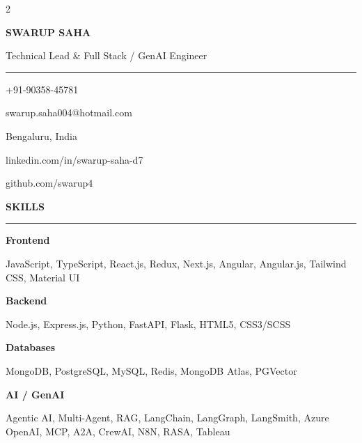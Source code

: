 \documentclass[10pt,a4paper]{article}
\newcommand{\sideheading}[1]{%
  \vspace{6pt}
  {\fontsize{9.3}{11}\bfseries\color{white}#1}\par
  \vspace{2pt}
  \textcolor{sidebarline}{\rule{\linewidth}{0.45pt}}
  \vspace{3pt}
}
\newcommand{\sideitem}[2]{%
  {\fontsize{8}{9.5}\bfseries\color{white}#1}\par
  {\fontsize{7.8}{9.5}\color{white}#2}\par
  \vspace{3pt}
}
\newcommand{\contact}[2]{%
  {\color{white}\fontsize{8}{9.5}\selectfont #1}\quad
  {\color{white}\fontsize{7.6}{9.5}\selectfont #2}\par
  \vspace{4pt}
}
\begin{document}
\setlength{\columnsep}{0.25in}

\begin{paracol}{2}

\colorbox{sidebar}{%
\begin{minipage}[t][10.95in][t]{\dimexpr\linewidth-2\fboxsep\relax}
\raggedright

\vspace{12pt}

\begin{center}
\end{center}

\vspace{8pt}

\begin{center}
  {\fontsize{16}{18}\bfseries\color{white}SWARUP SAHA}\par
  \vspace{3pt}
  {\fontsize{8.6}{10.5}\color{white}
  Technical Lead \& Full Stack / GenAI Engineer}
\end{center}

\vspace{8pt}
\textcolor{sidebarline}{\rule{\linewidth}{0.55pt}}
\vspace{7pt}

\contact{\faPhone}{+91-90358-45781}
\contact{\faEnvelope}{swarup.saha004@hotmail.com}
\contact{\faMapMarker*}{Bengaluru, India}
\contact{\faLinkedin}{linkedin.com/in/swarup-saha-d7}
\contact{\faGithub}{github.com/swarup4}

\sideheading{SKILLS}

\sideitem{Frontend}{JavaScript, TypeScript, React.js, Redux, Next.js, Angular, Angular.js, Tailwind CSS, Material UI}

\sideitem{Backend}{Node.js, Express.js, Python, FastAPI, Flask, HTML5, CSS3/SCSS}

\sideitem{Databases}{MongoDB, PostgreSQL, MySQL, Redis, MongoDB Atlas, PGVector}

\sideitem{AI / GenAI}{Agentic AI, Multi-Agent, RAG, LangChain, LangGraph, LangSmith, Azure OpenAI, MCP, A2A, CrewAI, N8N, RASA, Tableau}


\end{minipage}}
\end{paracol}
\end{document}
